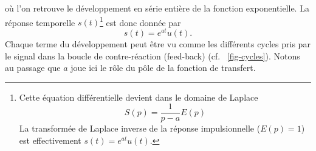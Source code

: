 où l'on retrouve le développement en série entière de la fonction 
exponentielle. La réponse temporelle $s(t)$\footnote{
Cette équation différentielle devient dans le domaine de Laplace
\[
    S(p)=\dfrac{1}{p-a}E(p)
\]
La transformée de Laplace inverse de la réponse impulsionnelle ($E(p)=1$)
est effectivement $s(t)=e^{at}u(t)$.
}
est donc donnée par 
\[
    s(t)=e^{at}u(t).
\]
Chaque terme du développement peut être vu comme les différents cycles 
pris par le signal dans la boucle de contre-réaction (feed-back) 
(cf. ~\cref{fig-cycles}).
Notons au passage que $a$ joue ici le rôle du pôle de la fonction de transfert. 
